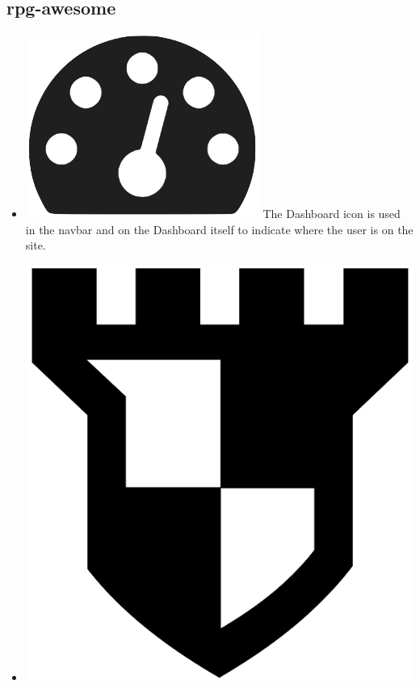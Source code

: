 \documentclass[12pt,a4paper]{report}
\begin{document}
	\subsection{rpg-awesome}
	\begin{itemize}
		\item \includegraphics[scale=.06]{dashboard_icon}
		The Dashboard icon is used in the navbar and on the Dashboard itself to indicate where the user is on the site.
		\begin{figure}
			\label{fig: Dashboard Icon}
		\end{figure}
		\item \includegraphics[scale=.03]{arena_icon}

\end{itemize}
\end{document}

